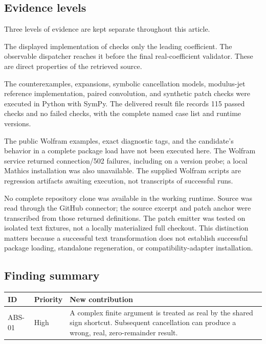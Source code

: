 \documentclass[11pt]{article}
\newcommand{\code}[1]{\texttt{\detokenize{#1}}}
\theoremstyle{remark}\newtheorem{remark}[theorem]{Remark}
\begin{document}
\subsection{Evidence levels}
Three levels of evidence are kept separate throughout this article.
\begin{description}[leftmargin=1.6em,style=nextline]
\item[Source-confirmed mechanism.]
The displayed implementation of \code{fwdAbs} checks only the leading coefficient.
The observable dispatcher reaches it before the final real-coefficient validator.
These are direct properties of the retrieved source.\cite{core,operations}
\item[Exact mathematical and executable-model evidence.]
The counterexamples, expansions, symbolic cancellation models, modulus-jet
reference implementation, paired convolution, and synthetic patch checks were
executed in Python with SymPy. The delivered result file records 115 passed
checks and no failed checks, with the complete named case list and runtime versions.
\item[Pending native observation.]
The public Wolfram examples, exact diagnostic tags, and the candidate's behavior
in a complete package load have not been executed here. The Wolfram service
returned connection/502 failures, including on a version probe; a local Mathics
installation was also unavailable. The supplied Wolfram scripts are regression
artifacts awaiting execution, not transcripts of successful runs.
\end{description}

No complete repository clone was available in the working runtime. Source was
read through the GitHub connector; the source excerpt and patch anchor were
transcribed from those returned definitions. The patch emitter was tested on
isolated text fixtures, not a locally materialized full checkout. This distinction
matters because a successful text transformation does not establish successful
package loading, standalone regeneration, or compatibility-adapter installation.

\subsection{Finding summary}
\begin{center}
\begin{tabularx}{\linewidth}{@{}l l X@{}}
\toprule
ID & Priority & New contribution\\
\midrule
ABS-01 & High & A complex finite argument is treated as real by the shared
\code{Abs} sign shortcut. Subsequent cancellation can produce a wrong,
real, zero-remainder result.\\
\bottomrule
\end{tabularx}
\end{center}
\end{document}
